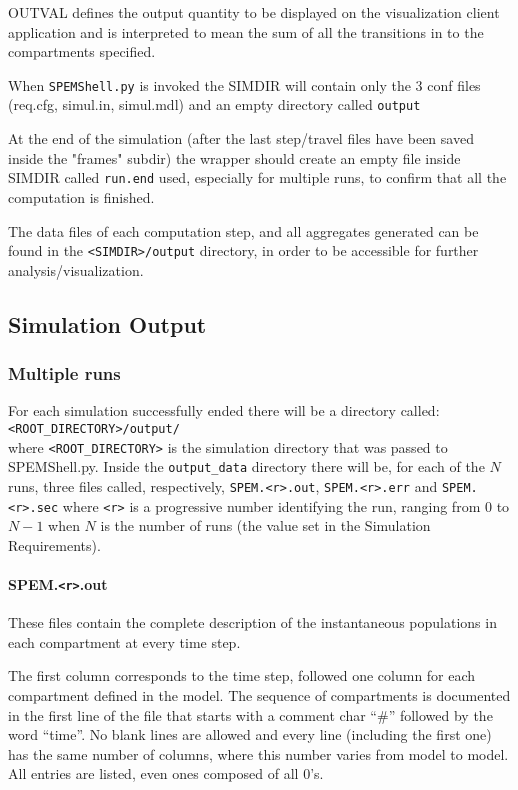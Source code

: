 \documentclass[a4paper, 11pt, fleqn]{paper}
\begin{document}
OUTVAL defines the output quantity to be displayed on the visualization
client application and is interpreted to mean the sum of all the transitions in to the compartments specified.

When \texttt{SPEMShell.py} is invoked the SIMDIR will contain
only the 3 conf files (req.cfg, simul.in, simul.mdl) and an empty
directory called \texttt{output}

At the end of the simulation (after the last step/travel files have
been saved inside the "frames" subdir) the wrapper should create an
empty file inside SIMDIR called \texttt{run.end}
used, especially for multiple runs, to confirm that all
the computation is finished.

The data files of each computation step, and all aggregates generated can be
found in the \texttt{<SIMDIR>/output} directory, in order to be
accessible for further analysis/visualization.

\subsection{Simulation Output}
\subsubsection*{Multiple runs}
For each simulation successfully ended there will be a directory called:\\

\texttt{<ROOT\_DIRECTORY>/output/}\\

\noindent
where \texttt{<ROOT\_DIRECTORY>} is the simulation directory that was passed to SPEMShell.py.
Inside the \texttt{output\_data} directory there will be, for each of the  $N$ runs, three files called, respectively, \texttt{SPEM.<r>.out},  \texttt{SPEM.<r>.err}  and \texttt{SPEM.<r>.sec} where \texttt{<r>} is a progressive number identifying the run, ranging from $0$ to $N-1$ when $N$ is the number of runs (the value set in the Simulation Requirements).

\paragraph*{SPEM.\texttt{<r>}.out}

These files contain the complete description of the instantaneous populations in each compartment at every time step.

The first column corresponds to the time step, followed one column for each compartment defined in the model. The sequence of compartments is documented in the first line of the file that starts with a comment char ``\#'' followed by the word ``time''. No blank lines are allowed and every line (including the first one) has the same number of columns, where this number varies from model to model. All entries are listed, even ones composed of all $0$'s. 
\end{document}
